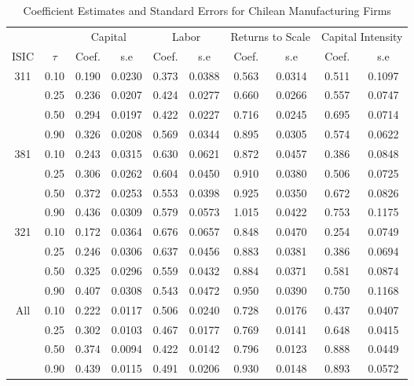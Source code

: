 \begin{table}[ht]
\centering
\caption{Coefficient Estimates and Standard Errors for Chilean Manufacturing Firms} 
\begin{tabular}{cccccccccc}
  \hline\hline & & \multicolumn{2}{c}{Capital}  & \multicolumn{2}{c}{Labor} & \multicolumn{2}{c}{Returns to Scale} & \multicolumn{2}{c}{Capital Intensity}\\ \cmidrule(lr){3-4} \cmidrule(lr){5-6} \cmidrule(lr){7-8} \cmidrule(lr){9-10}ISIC & $\tau$ & Coef. & s.e & Coef. & s.e & Coef. & s.e & Coef. & s.e \\ 
  \hline
311 & 0.10 & 0.190 & 0.0230 & 0.373 & 0.0388 & 0.563 & 0.0314 & 0.511 & 0.1097 \\ 
   & 0.25 & 0.236 & 0.0207 & 0.424 & 0.0277 & 0.660 & 0.0266 & 0.557 & 0.0747 \\ 
   & 0.50 & 0.294 & 0.0197 & 0.422 & 0.0227 & 0.716 & 0.0245 & 0.695 & 0.0714 \\ 
   & 0.90 & 0.326 & 0.0208 & 0.569 & 0.0344 & 0.895 & 0.0305 & 0.574 & 0.0622 \\ 
  381 & 0.10 & 0.243 & 0.0315 & 0.630 & 0.0621 & 0.872 & 0.0457 & 0.386 & 0.0848 \\ 
   & 0.25 & 0.306 & 0.0262 & 0.604 & 0.0450 & 0.910 & 0.0380 & 0.506 & 0.0725 \\ 
   & 0.50 & 0.372 & 0.0253 & 0.553 & 0.0398 & 0.925 & 0.0350 & 0.672 & 0.0826 \\ 
   & 0.90 & 0.436 & 0.0309 & 0.579 & 0.0573 & 1.015 & 0.0422 & 0.753 & 0.1175 \\ 
  321 & 0.10 & 0.172 & 0.0364 & 0.676 & 0.0657 & 0.848 & 0.0470 & 0.254 & 0.0749 \\ 
   & 0.25 & 0.246 & 0.0306 & 0.637 & 0.0456 & 0.883 & 0.0381 & 0.386 & 0.0694 \\ 
   & 0.50 & 0.325 & 0.0296 & 0.559 & 0.0432 & 0.884 & 0.0371 & 0.581 & 0.0874 \\ 
   & 0.90 & 0.407 & 0.0308 & 0.543 & 0.0472 & 0.950 & 0.0390 & 0.750 & 0.1168 \\ 
  All & 0.10 & 0.222 & 0.0117 & 0.506 & 0.0240 & 0.728 & 0.0176 & 0.437 & 0.0407 \\ 
   & 0.25 & 0.302 & 0.0103 & 0.467 & 0.0177 & 0.769 & 0.0141 & 0.648 & 0.0415 \\ 
   & 0.50 & 0.374 & 0.0094 & 0.422 & 0.0142 & 0.796 & 0.0123 & 0.888 & 0.0449 \\ 
   & 0.90 & 0.439 & 0.0115 & 0.491 & 0.0206 & 0.930 & 0.0148 & 0.893 & 0.0572 \\ 
   \hline
\end{tabular}
\end{table}

